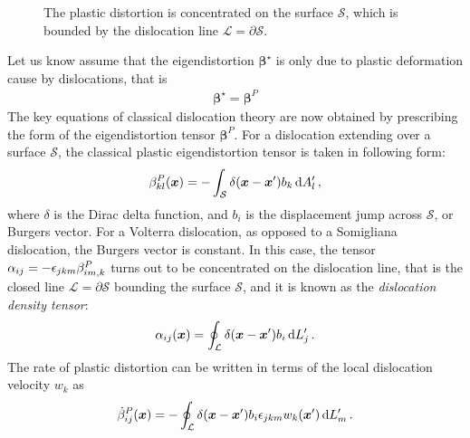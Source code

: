  \begin{figure}[t]
\centering
{}
\caption{The plastic distortion is concentrated on the surface $\mathcal{S}$, which is bounded by the dislocation line $\mathcal{L}=\partial\mathcal{S}$.}
\label{fig:dislocation_loop} 
\end{figure}
Let us know assume that the eigendistortion $\bm \beta^\star$ is only due to plastic deformation cause by dislocations, that is
\begin{align}
\bm \beta^\star=\bm \beta^P
\end{align}
The key equations of classical dislocation theory are now obtained by prescribing  the form of the eigendistortion tensor $\bm \beta^P$. For a dislocation extending over a surface $\mathcal{S}$,  the classical plastic eigendistortion tensor is taken in following form:
\begin{align}
\beta^{P}_{kl}(\bm x)=-\int_\mathcal{S}\delta(\bm x-\bm x')b_k\, \text{d}A_l'\, ,
\label{dislocation_distortion_classical}
\end{align}
where $\delta$ is the Dirac delta function, and $b_i$ is the displacement jump across $\mathcal{S}$, or Burgers vector. For a Volterra dislocation, as opposed to a Somigliana dislocation,  the Burgers vector is constant. In this case,  the  tensor $\alpha_{ij}=-\epsilon_{jkm}\beta^{P}_{im,k}$ turns out to be concentrated on the dislocation line, that is the closed line $\mathcal{L}=\partial\mathcal{S}$ bounding the surface $\mathcal{S}$, and it is known as the \textit{dislocation density tensor}:
\begin{align}
\alpha_{ij}(\bm x)=\oint_{\mathcal{L}}\delta(\bm x-\bm x')b_i\, \text{d}L_j'\, .
\label{dislocation_alpha_classical}
\end{align}
The rate of plastic distortion can be written in terms of the local dislocation velocity $w_k$ as
\begin{align}
\dot{\beta}^P_{ij}(\bm x)
=-\oint_{\mathcal{L}}\delta(\bm x-\bm x')b_i\epsilon_{jkm}w_k(\bm x')\, \text{d}L_m'\,.
\label{plasticDistortionRateLoop}
\end{align}

